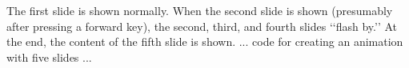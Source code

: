\documentclass{beamer}
\begin{document}
\begin{frame}
The first slide is shown normally. 
\pause
When the second slide is shown
(presumably after pressing a forward key), 
\pause
the second, third, and
fourth slides ‘‘flash by.’’ 
\pause
At the end, the content of the fifth
slide is shown.
... code for creating an animation with five slides ...
\end{frame}
\end{document}
